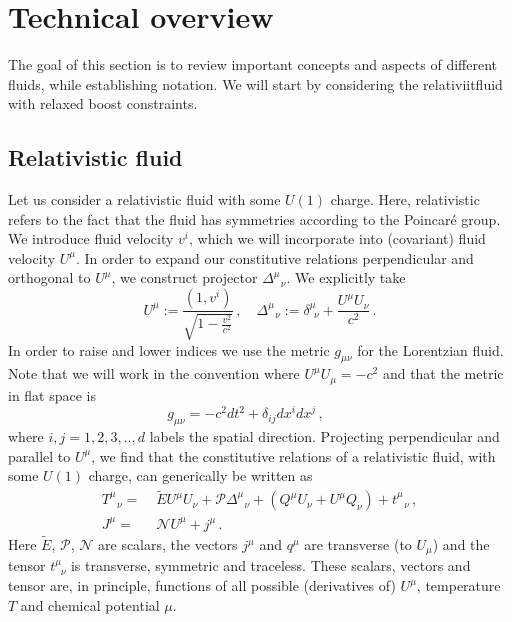 \documentclass[superscriptaddress,prd,nofootinbib,preprintnumbers,longbibliography,11pt,eqsecnum]{revtex4-1}
\begin{document}
\section{Technical overview}\label{sec:technicalOverview}

The goal of this section is to review important concepts and aspects of different fluids, while establishing notation. We will start by considering the relativiitfluid with relaxed boost constraints. 
\subsection{Relativistic fluid}
Let us consider a relativistic fluid with some $U(1)$ charge. Here, relativistic refers to the fact that the fluid has symmetries according to the Poincar\'{e} group. We introduce fluid velocity $v^{i}$, which we will incorporate into (covariant) fluid velocity $U^{\mu}$. In order to expand our constitutive relations perpendicular and orthogonal to $U^{\mu}$, we construct projector $\Delta^{\mu}_{\;\;\,\nu}$. We explicitly take
\begin{equation}
	U^{\mu}
:=
	\frac{(1,v^{i})}{\sqrt{1-\frac{v^{2}}{c^{2}}}}
	\,,
	\quad
	\Delta^{\mu}_{\;\;\,\nu}
	:=
	\delta^{\mu}_{\;\,\nu}
	+
	\frac{U^{\mu}U_{\nu}}{c^{2}}
	\,.
\end{equation}
In order to raise and lower indices we use the metric $g_{\mu\nu}$ for the Lorentzian fluid. Note that we will work in the convention where $U^\mu U_\mu = -c^2$ and that the metric in flat space is 
\begin{equation}
  g_{\mu \nu} = -c^2 dt^2 + \delta_{ij}dx^i dx^j \,, \qquad 
\end{equation}
where $i,j = 1,2,3,..,d$ labels the spatial direction.
Projecting perpendicular and parallel to $U^{\mu}$, we find that the constitutive relations of a relativistic fluid, with some $U(1)$ charge, can generically be written as
\begin{equation}\label{eq:general-Lorentzian-constitutiveReln}
\begin{aligned}
	T^{\mu}_{\;\;\,\nu}
	=&\;
	\tilde{E}U^{\mu}U_{\nu}
	+
	\mathcal{P}\Delta^{\mu}_{\;\;\,\nu}
	+
	(Q^{\mu}U_{\nu}+U^{\mu}Q_{\nu})
	+
	t^{\mu}_{\;\;\,\nu}
	\,,
	\\
	J^{\mu}
	=&\;
	\mathcal{N}U^{\mu}
	+
	j^{\mu}
	\,.
\end{aligned}
\end{equation}
Here $\tilde{E}$, $\mathcal{P}$, $\mathcal{N}$ are scalars, the vectors $j^{\mu}$ and $q^{\mu}$ are transverse (to $U_{\mu}$) and the tensor $t^{\mu}_{\;\;\nu}$ is transverse, symmetric and traceless. These scalars, vectors and tensor are, in principle, functions of all possible (derivatives of) $U^{\mu}$, temperature $T$ and chemical potential $\mu$. 
\end{document}
